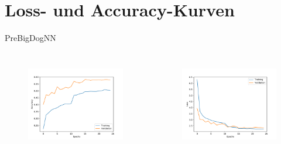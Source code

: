   \section{Loss- und Accuracy-Kurven}

  \begin{frame}[noframenumbering]
    \tableofcontents[currentsection]
  \end{frame}

  \begin{frame}{PreBigDogNN}
    \begin{columns}[c]
      \begin{figure}
        \centering
        \includegraphics[width=\textwidth]{logos/PreBigDogNN/history_acc_prebig.pdf}
        \label{fig:acc_prebig}
      \end{figure}
      \begin{figure}
        \centering
        \includegraphics[width=\textwidth]{logos/PreBigDogNN/history_loss_prebig.pdf}
        \label{fig:loss_prebig}
      \end{figure}
    \end{columns}
  \end{frame}

